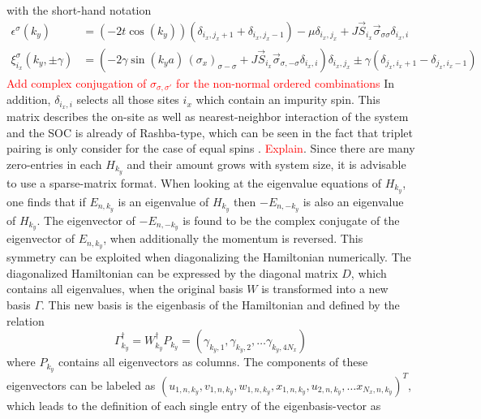 with the short-hand notation 
\begin{align}\nonumber
    \epsilon^{\sigma}(k_y) &= \left( -2t \cos{(k_y)}\right)(\delta_{i_x,j_x+1}+\delta_{i_x,j_x-1})-\mu\delta_{i_x,j_x} + J\Vec{S}_{i_x}\Vec{\sigma}_{\sigma \sigma}\delta_{i_x,i} \\ \label{eq:ham_num_shorthand}
    \xi^{\sigma}_{i_x}(k_y,\pm \gamma) &= \left( -2 \gamma \sin{(k_ya)} \, (\sigma_x)_{\sigma-\sigma}+ J\Vec{S}_{i_x}\Vec{\sigma}_{\sigma, -\sigma}\delta_{i_x,i}\right)\delta_{i_x,j_x} \pm\gamma (\delta_{j_x,i_x+1}-\delta_{j_x,i_x-1})
\end{align}
\textcolor{red}{Add complex conjugation of $\sigma_{\sigma, \sigma'}$ for the non-normal ordered combinations} \newline
In addition, $\delta_{i_x,i}$ selects all those sites $i_x$ which contain an impurity spin.\newline
This matrix describes the on-site as well as nearest-neighbor interaction of the system and the SOC is already of Rashba-type, which can be seen in the fact that triplet pairing is only consider for the case of equal spins \cite{frigeri2004superconductivity}. \textcolor{red}{Explain}.
Since there are many zero-entries in each $H_{k_y}$ and their amount grows with system size, it is advisable to use a sparse-matrix format.
\newline
When looking at the eigenvalue equations of $H_{k_y}$, one finds that if $E_{n,k_y}$ is an eigenvalue of $H_{k_y}$ then $-E_{n,-k_y}$ is also an eigenvalue of $H_{k_y}$.
The eigenvector of $-E_{n,-k_y}$ is found to be the complex conjugate of the eigenvector of $E_{n,k_y}$, when additionally the momentum is reversed.
This symmetry can be exploited when diagonalizing the Hamiltonian numerically. \newline
The diagonalized Hamiltonian can be expressed by the diagonal matrix $D$, which contains all eigenvalues, when the original basis $W$ is transformed into a new basis $\Gamma$.
This new basis is the eigenbasis of the Hamiltonian and defined by the relation 
\begin{equation}
    \Gamma^{\dag}_{k_y} = W^{\dag}_{k_y} P_{k_y} = \left( \gamma_{k_y,1}, \gamma_{k_y,2}, \hdots \gamma_{k_y,4N_x}\right)
\end{equation}
where $P_{k_y}$ contains all eigenvectors as columns. 
The components of these eigenvectors can be labeled as $\left( u_{1,n,k_y}, v_{1,n,k_y}, w_{1,n,k_y}, x_{1,n,k_y}, u_{2,n,k_y}, \hdots x_{N_x,n,k_y}\right)^T$, which leads to the definition of each single entry of the eigenbasis-vector as
